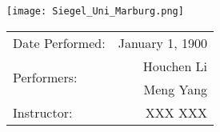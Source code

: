 \maketitle %

\begin{figure*}[!htbp]
	\centering
	\texttt{[image: Siegel\_Uni\_Marburg.png]}
\end{figure*}

\bigskip

\begin{center}
\begin{tabular}[htbp]{l r}
Date Performed: & January 1, 1900 \\ %
\multirow{2}{*}{Performers:} & Houchen Li \\ %
& Meng Yang \\
Instructor: & XXX XXX %
\end{tabular}
\end{center}

\bigskip


